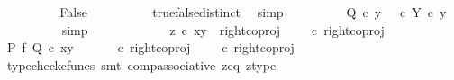 \begin{isabellebody}
\ \ \ \ \ \ \isamarkupfalse%
\ \isamarkupfalse%
\ False\isanewline
\ \ \ \ \ \ \ \ \isamarkupfalse%
\ true{\isacharunderscore}{\kern0pt}false{\isacharunderscore}{\kern0pt}distinct\ \isamarkupfalse%
\ simp\isanewline
\ \ \ \ \ \ \isamarkupfalse%
\ \isamarkupfalse%
\ {\isachardoublequoteopen}Q\ {\isasymcirc}\isactrlsub c\ y\ {\isacharequal}{\kern0pt}\ {\isacharparenleft}{\kern0pt}{\isasymt}\ {\isasymcirc}\isactrlsub c\ {\isasymbeta}\isactrlbsub Y\isactrlesub {\isacharparenright}{\kern0pt}\ {\isasymcirc}\isactrlsub c\ y{\isachardoublequoteclose}\isanewline
\ \ \ \ \ \ \ \ \isamarkupfalse%
\ simp\isanewline
\ \ \ \ \isamarkupfalse%
\isanewline
\ \ \ \ \ \ \isamarkupfalse%
\ {\isachardoublequoteopen}z\ {\isasymcirc}\isactrlsub c\ {\isasymlangle}x{\isacharcomma}{\kern0pt}y{\isasymrangle}\ {\isacharequal}{\kern0pt}\ right{\isacharunderscore}{\kern0pt}coproj\ {\isasymone}\ {\isacharparenleft}{\kern0pt}{\isasymone}\ {\isasymCoprod}\ {\isasymone}{\isacharparenright}{\kern0pt}\ {\isasymcirc}\isactrlsub c\ right{\isacharunderscore}{\kern0pt}coproj\ {\isasymone}\ {\isasymone}{\isachardoublequoteclose}\isanewline
\ \ \ \ \ \ \isamarkupfalse%
\ \isamarkupfalse%
\ {\isachardoublequoteopen}{\isacharparenleft}{\kern0pt}P\ {\isasymtimes}\isactrlsub f\ Q{\isacharparenright}{\kern0pt}\ {\isasymcirc}\isactrlsub c\ {\isasymlangle}x{\isacharcomma}{\kern0pt}y{\isasymrangle}\ {\isacharequal}{\kern0pt}\ {\isacharparenleft}{\kern0pt}{\isasymlangle}{\isasymt}{\isacharcomma}{\kern0pt}{\isasymt}{\isasymrangle}\ {\isasymamalg}\ {\isasymlangle}{\isasymf}{\isacharcomma}{\kern0pt}{\isasymf}{\isasymrangle}\ {\isasymamalg}\ {\isasymlangle}{\isasymf}{\isacharcomma}{\kern0pt}{\isasymt}{\isasymrangle}{\isacharparenright}{\kern0pt}\ {\isasymcirc}\isactrlsub c\ right{\isacharunderscore}{\kern0pt}coproj\ {\isasymone}\ {\isacharparenleft}{\kern0pt}{\isasymone}\ {\isasymCoprod}\ {\isasymone}{\isacharparenright}{\kern0pt}\ {\isasymcirc}\isactrlsub c\ right{\isacharunderscore}{\kern0pt}coproj\ {\isasymone}\ {\isasymone}{\isachardoublequoteclose}\isanewline
\ \ \ \ \ \ \ \ \isamarkupfalse%
\ {\isacharparenleft}{\kern0pt}typecheck{\isacharunderscore}{\kern0pt}cfuncs{\isacharcomma}{\kern0pt}\ smt\ comp{\isacharunderscore}{\kern0pt}associative{}\ z{\isacharunderscore}{\kern0pt}eq\ z{\isacharunderscore}{\kern0pt}type{\isacharparenright}{\kern0pt}\isanewline
\ \ \ \ \ \ \isamarkupfalse%

\end{isabellebody}
